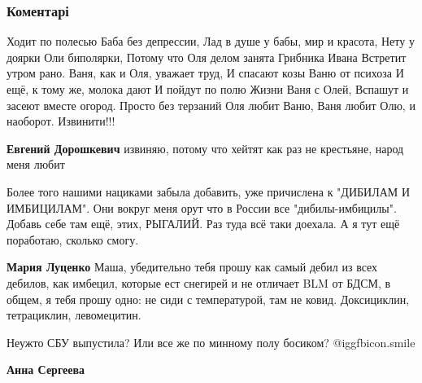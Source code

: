  
 
 
 
 
\subsubsection{Коментарі}

\begin{itemize} %

\obeycr
Ходит по полесью
Баба без депрессии,
Лад в душе у бабы, мир и красота,
Нету у доярки
Оли биполярки,
Потому что Оля делом занята
Грибника Ивана
Встретит утром рано.
Ваня, как и Оля, уважает труд,
И спасают козы
Ваню от психоза
И ещё, к тому же, молока дают
И пойдут по полю
Жизни Ваня с Олей,
Вспашут и засеют вместе огород.
Просто без терзаний
Оля любит Ваню,
Ваня любит Олю, и наоборот.
Извинити!!!
\restorecr

\begin{itemize} %
\textbf{Евгений Дорошкевич} извиняю, потому что хейтят как раз не крестьяне, народ меня любит
\end{itemize} %


Более того нашими нациками забыла добавить, уже причислена к "ДИБИЛАМ И
ИМБИЦИЛАМ". Они вокруг меня орут что в России все "дибилы-имбицилы". Добавь
себе там ещё, этих, РЫГАЛИЙ. Раз туда всё таки доехала. А я тут ещё поработаю,
сколько смогу.

\begin{itemize} %
\textbf{Мария Луценко} Маша, убедительно тебя прошу как самый дебил из всех дебилов, как имбецил, которые ест снегирей и не отличает BLM от БДСМ, в общем, я тебя прошу одно: не сиди с температурой, там не ковид. Доксициклин, тетрациклин, левомецитин.
\end{itemize} %

Неужто СБУ выпустила? Или все же по минному полу босиком?  @igg{fbicon.smile} 

\begin{itemize} %
\textbf{Анна Сергеева} 


\end{itemize}
\end{itemize}
